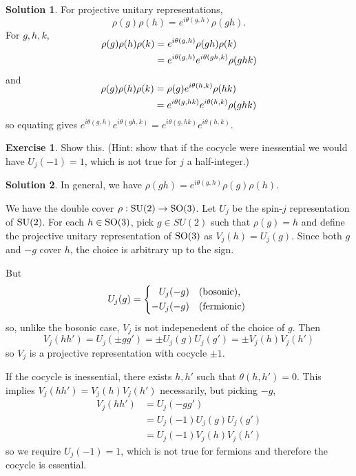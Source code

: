 \documentclass[11pt, a4paper]{report}
\theoremstyle{definition}
\newtheorem{exercise}{Exercise}[part]
\newtheorem{solution}{Solution}[part]
\newenvironment{ex}{\begin{exercise}}{\end{exercise}\pagebreak[1]}
\newenvironment{sol}{\begin{solution}}{\end{solution}\pagebreak[3]}
\newcommand*{\SO}{\ensuremath\text{SO}}
\newcommand*{\SU}{\ensuremath\text{SU}}
\begin{document}
\begin{sol}

For projective unitary representations,
\[
    \rho(g) \rho(h) = e^{i\theta(g, h)} \rho(gh).
\]
For $g, h, k$,
\begin{align*}
    \SwapAboveDisplaySkip
    \rho(g) \rho(h) \rho(k) &= e^{i\theta(g, h)} \rho(gh) \rho(k) \\
                            &= e^{i\theta(g, h)} e^{i\theta(gh, k)} \rho(ghk)
\end{align*}
and
\begin{align*}
    \SwapAboveDisplaySkip
    \rho(g) \rho(h) \rho(k) &= \rho(g) e^{i\theta(h, k)} \rho(hk) \\
                            &= e^{i\theta(g, hk)} e^{i\theta(h, k)} \rho(ghk)
\end{align*}
so equating gives $e^{i\theta(g, h)} e^{i\theta(gh, k)} = e^{i\theta(g, hk)} e^{i\theta(h, k)}$.

\end{sol}

\begin{ex}

Show this.
(Hint: show that if the cocycle were inessential we would have $U_j(-1) = 1$, which is not true for $j$ a half-integer.)

\end{ex}

\begin{sol}

In general, we have $\rho(gh) = e^{i\theta(g, h)} \rho(g) \rho(h)$.

We have the double cover $\rho: \SU(2) \to \SO(3)$.
Let $U_j$ be the spin-$j$ representation of $\SU(2)$.
For each $h \in \SO(3)$, pick $g \in SU(2)$ such that $\rho(g) = h$ and define the projective unitary representation of $\SO(3)$ as $V_j(h) = U_j(g)$.
Since both $g$ and $-g$ cover $h$, the choice is arbitrary up to the sign.

But
\[
    U_j(g) = \begin{dcases*}
                \phantom{-} U_j(-g) & \text{(bosonic)}, \\
                -U_j(-g)            & \text{(fermionic)}
             \end{dcases*}
\]
so, unlike the bosonic case, $V_j$ is not indepenedent of the choice of $g$.
Then
\[
    V_j(hh') = U_j(\pm gg') = \pm U_j(g) U_j(g') = \pm V_j(h) V_j(h')
\]
so $V_j$ is a projective representation with cocycle $\pm1$.

If the cocycle is inessential, there exists $h, h'$ such that $\theta(h, h') = 0$.
This implies $V_j(hh') = V_j(h) V_j(h')$ necessarily, but picking $-g$,
\begin{align*}
    V_j(hh') &= U_j(-gg') \\
             &= U_j(-1) U_j(g) U_j(g') \\
             &= U_j(-1) V_j(h) V_j(h')
\end{align*}
so we require $U_j(-1) = 1$, which is not true for fermions and therefore the cocycle is essential.

\end{sol}
\end{document}
